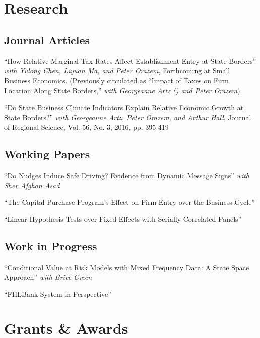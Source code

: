 \documentclass[letterpaper]{article}
\renewenvironment{itemize}{
  \begin{list}{}{
    \setlength{\leftmargin}{0em}
  }
}{
  \end{list}
}
\begin{document}
\section*{Research}

\subsection*{Journal Articles}

\begin{itemize}
\item ``How Relative Marginal Tax Rates Affect Establishment Entry at State Borders'' \textit{with Yulong Chen, Liyuan Ma, and Peter Orazem}, Forthcoming at Small Business Economics. (Previously circulated as ``Impact of Taxes on Firm Location Along State Borders,'' \textit{with Georgeanne Artz (\dag) and Peter Orazem})
\item``Do State Business Climate Indicators Explain Relative Economic Growth at State Borders?'' \textit{with Georgeanne Artz, Peter Orazem, and Arthur Hall}, Journal of Regional Science, Vol. 56, No. 3, 2016, pp. 395-419
\end{itemize}

\subsection*{Working Papers}

\begin{itemize}
\item ``Do Nudges Induce Safe Driving? Evidence from Dynamic Message Signs'' \textit{with Sher Afghan Asad}
\item ``The Capital Purchase Program's Effect on Firm Entry over the Business Cycle''
\item ``Linear Hypothesis Tests over Fixed Effects with Serially Correlated Panels''

\subsection*{Work in Progress}
\item ``Conditional Value at Risk Models with Mixed Frequency Data: A State Space Approach'' \textit{with Brice Green}
\item ``FHLBank System in Perspective''
\end{itemize}




\section*{Grants \& Awards}
\end{document}
